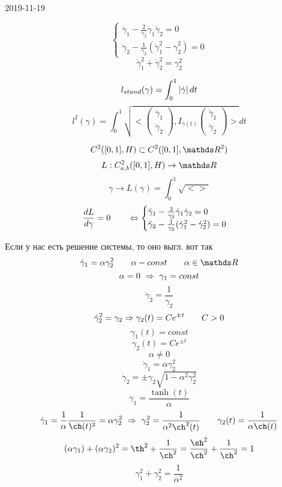 \documentclass[12pt, fleqn]{article}
\begin{document}
\begin{lect}{2019-11-19}
    \begin{Sol}
        \[\begin{cases}
            \ddot{\gamma}_1 - \frac{2}{\gamma_2} \dot{\gamma}_1 \dot{\gamma}_2 = 0\\
            \ddot{\gamma}_2 - \frac{1}{\gamma_2} (\dot{\gamma}_1^2 - \dot{\gamma}_2^2) = 0
        \end{cases}\]
        \[\dot{\gamma}_1^2 + \dot{\gamma}_2^2 = \gamma_2^2\]

        \[l_{stand}(\gamma) = \int_0^1 \left|\dot{\gamma}\right|dt \]
        \[l^I(\gamma) = \int_0^1 \sqrt{<\begin{pmatrix}
            \dot{\gamma}_1\\
            \dot{\gamma}_2
            \end{pmatrix}, I_{\gamma(t)}  \begin{pmatrix}
            \dot{\gamma}_1\\
            \dot{\gamma}_2
        \end{pmatrix}>}dt\]
    \end{Sol}

    \[C^2([0, 1], H) \subset C^2([0, 1], \R^2)\]
    \[L: C^2_{a,b}([0, 1], H) \to \R \]
    \[\gamma \to L(\gamma) = \int_0^1 \sqrt{ <>}\]
    \[\frac{dL}{d\gamma} = 0 \qquad \Leftrightarrow \begin{cases}
            \ddot{\gamma}_1 - \frac{2}{\gamma_2} \dot{\gamma}_1 \dot{\gamma}_2 = 0\\
            \ddot{\gamma}_2 - \frac{1}{\gamma_2} (\dot{\gamma}_1^2 - \dot{\gamma}_2^2) = 0
        \end{cases} \]

        Если у нас есть решение системы, то оно выгл. вот так
    \[\dot{\gamma}_1 = \alpha \gamma_2^2 \qq \alpha - const \qq \alpha \in \R\]
    \[\alpha = 0 \ \Rightarrow\ \gamma_1 = const\]
    \[\ddot{\gamma}_2 = \frac{1}{\gamma_2}\]
    \[\dot{\gamma}_2^2 = \gamma_2  \Rightarrow \gamma_2(t) = C e^{\pm t} \qquad C > 0 \]
    \[\gamma_1(t) = const\]
    \[\gamma_2(t) = Ce^{\pm t}\]
    \[\alpha \neq 0\]
    \[\dot{\gamma}_1 = \alpha \gamma_2^2\]
    \[\dot{\gamma}_2 = \pm \gamma_2 \sqrt{ 1 - \alpha^2 \gamma_2^2}\]
    \[\gamma_1 = \frac{\tanh (t)}{\alpha}\]
    \[\dot{\gamma}_1 = \frac{1}{\alpha} \frac{1}{\ch(t)^2} = \alpha \gamma_2^2  \ \Ra \
    \gamma_2^2 = \frac{1}{\alpha^2 \ch^2(t)}  \qq \gamma_2(t) = \frac{1}{\alpha \ch(t)}\]
    \[(\alpha \gamma_1) + (\alpha \gamma_2)^2  = \th^2 + \frac{1}{\ch^2} = \frac{\sh^2}{\ch^2} + 
    \frac{1}{\ch^2} = 1\]
    \[\gamma_1^2 + \gamma_2^2 = \frac{1}{\alpha^2}\]
\end{lect}
\end{document}
